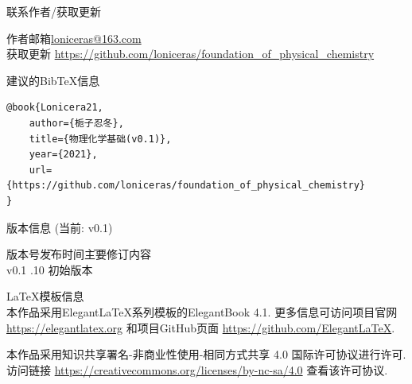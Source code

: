 \thispagestyle{empty}

\noindent 联系作者/获取更新
\begin{tabbing}
	作者邮箱\qquad \= \url{loniceras@163.com} \\
	获取更新 \> \url{https://github.com/loniceras/foundation_of_physical_chemistry}
\end{tabbing}

\vspace*{\baselineskip}
\noindent 建议的BibTeX信息
\begin{verbatim}
@book{Lonicera21,
    author={栀子忍冬},
    title={物理化学基础(v0.1)},
    year={2021},
    url={https://github.com/loniceras/foundation_of_physical_chemistry}
}
\end{verbatim}

\vspace*{\baselineskip}
\noindent 版本信息 (当前: v0.1)
\begin{tabbing}
	版本号\qquad \= 发布时间\qquad \= 主要修订内容 \\
	v0.1 .10 \> 初始版本 \\
\end{tabbing}

\vspace*{\baselineskip}
\noindent LaTeX模板信息
\vspace*{\topsep}\\
\noindent 本作品采用ElegantLaTeX系列模板的ElegantBook 4.1. 更多信息可访问项目官网 \url{https://elegantlatex.org} 和项目GitHub页面 \url{https://github.com/ElegantLaTeX}.

\vspace*{8cm}
\begin{window}
	\noindent 本作品采用知识共享署名-非商业性使用-相同方式共享 4.0 国际许可协议进行许可. 访问链接 \url{https://creativecommons.org/licenses/by-nc-sa/4.0} 查看该许可协议.
\end{window}